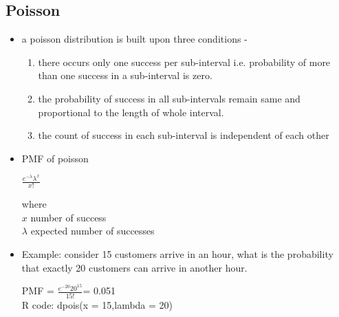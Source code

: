 \documentclass{article}
\begin{document}
\subsection{Poisson}
\begin{itemize}
	\item a poisson distribution is built upon three conditions -
		\begin{enumerate}
		given an interval of real number constituting of an outcome of interest/success, if this interval is broken down into various sub-intervals 
			\item there occurs only one success per sub-interval i.e. probability of more than one success in a sub-interval is zero.
			\item the probability of success in all sub-intervals remain same and proportional to the length of whole interval.
			\item the count of success in each sub-interval is independent of each other
		\end{enumerate}
	\item PMF of poisson
		\begin{center}
			\mbox{\Large\( \frac{e^{-\lambda}\lambda^x}{x!} \)} 		
		\end{center}
	where\\
	$x$ number of success\\
	$\lambda$ expected number of successes
	
	\item Example: consider 15 customers arrive in an hour, what is the probability that exactly 20 customers can arrive in another hour.
	
	\begin{center}
			PMF = \mbox{\Large\( \frac{e^{-20}20^{15}}{15!} \)}= 0.051\\
			R code: dpois(x = 15,lambda = 20) 			
	\end{center}

	
\end{itemize}
\end{document}
